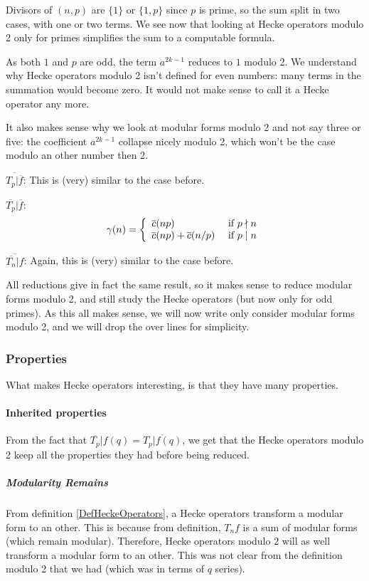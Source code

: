 Divisors of $(n,p)$ are $\{1\}$ or $\{1,p\}$ since $p$ is prime, so the sum split in two cases, with one or two terms.
We see now that looking at Hecke operators modulo 2 only for primes simplifies the sum to a computable formula.

As both $1$ and $p$ are odd, the term $a^{2k-1}$ reduces to $1$ modulo 2.
We understand why Hecke operators modulo 2 isn't defined for even numbers: many terms in the summation would become zero.
It would not make sense to call it a Hecke operator any more.

It also makes sense why we look at modular forms modulo 2 and not say three or five: the coefficient $a^{2k-1}$ collapse nicely modulo 2, which won't be the case modulo an other number then 2.

$\overline{T_p|\overline{f}}$:
This is (very) similar to the case before.

$\overline{T_p}|\overline{f}$:
$$
\gamma(n)
= \left\lbrace
\begin{array}{l l}
  \overline{c}(np)                   & \text{ if } p \nmid n \\
  \overline{c}(np)+\overline{c}(n/p) & \text{ if } p \mid  n
\end{array}
\right.
$$

$\overline{\overline{T_n}|f}$:
Again, this is (very) similar to the case before.

All reductions give in fact the same result, so it makes sense to reduce modular forms modulo 2, and still study the Hecke operators (but now only for odd primes).
As this all makes sense, we will now write only consider modular forms modulo 2, and we will drop the over lines for simplicity.

\subsubsection{Properties}
What makes Hecke operators interesting, is that they have many properties.

\paragraph{Inherited properties}
From the fact that $\overline{T_p}|f(q) = \overline{T_p|f(q)}$, we get that the Hecke operators modulo 2 keep all the properties they had before being reduced.

\subparagraph{Modularity Remains}
From definition \ref{DefHeckeOperators}, a Hecke operators transform a modular form to an other.
This is because from definition, $T_nf$ is a sum of modular forms (which remain modular).
Therefore, Hecke operators modulo 2 will as well transform a modular form to an other.
This was not clear from the definition modulo 2 that we had (which was in terms of $q$ series).

